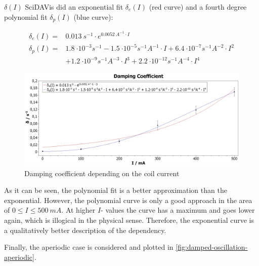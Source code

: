             $ \delta(I) $ SciDAVis did an exponential fit $ \delta_e(I) $ (red curve) and a fourth degree polynomial fit
            $ \delta_p(I) $ (blue curve):\par
            \begin{align}
                \delta_e(I)=&\SI{0.013}{s^{-1}}\cdot e^{\SI{0.0052}{A^{-1}}\cdot I}\\
                \delta_p(I)=&\SI{1.8}{\cdot 10^{-3}s^{-1}} - \SI{1.5}{\cdot 10^{-5}s^{-1}A^{-1}}\cdot I + \SI{6.4}{\cdot 10^{-7}s^{-1}A^{-2}}\cdot I^2 \nonumber\\
                            &+ \SI{1.2}{\cdot 10^{-9}s^{-1}A^{-3}}\cdot I^3 + \SI{2.2}{\cdot 10^{-12}s^{-1}A^{-4}}\cdot I^4
            \end{align}
            \begin{figure}
                \centering
                \includegraphics[width=1\linewidth]{"messdaten/Damping Coefficient"}
                \caption[Damping coefficient depending on the coil current]{Damping coefficient depending on the coil current}
                \label{fig:damping-coefficient}
            \end{figure}
            As it can be seen, the polynomial fit is a better approximation than the exponential. However, the polynomial curve
            is only a good approach in the area of $ 0 \leq I \leq \SI{500}{mA} $. At higher $ I $- values the curve has a maximum
            and goes lower again, which is illogical in the physical sense. Therefore, the exponential curve is a qualitatively
            better description of the dependency.\par\medskip
            Finally, the aperiodic case is considered and plotted in \cref{fig:damped-oscillation-aperiodic}.\par
